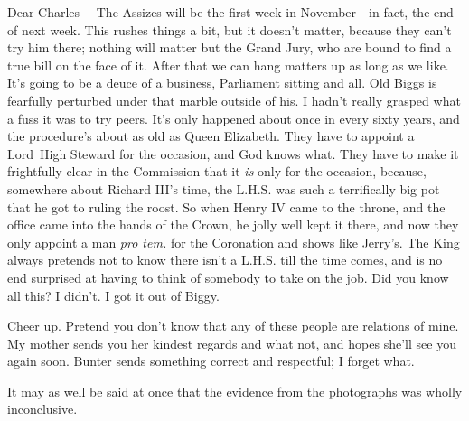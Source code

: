 \begin{mail}{}{Dear Charles---}
The Assizes will be the first week in November—in fact, the end of next week. This rushes things a bit, but it doesn't matter, because they can't try him there; nothing will matter but the Grand Jury, who are bound to find a true bill on the face of it. After that we can hang matters up as long as we like. It's going to be a deuce of a business, Parliament sitting and all. Old Biggs is fearfully perturbed under that marble outside of his. I hadn't really grasped what a fuss it was to try peers. It's only happened about once in every sixty years, and the procedure's about as old as Queen Elizabeth. They have to appoint a Lord~High Steward for the occasion, and God knows what. They have to make it frightfully clear in the Commission that it \textit{is} only for the occasion, because, somewhere about Richard III's time, the L\@.H\@.S\@. was such a terrifically big pot that he got to ruling the roost. So when Henry IV came to the throne, and the office came into the hands of the Crown, he jolly well kept it there, and now they only appoint a man \textit{pro tem.} for the Coronation and shows like Jerry's. The King always pretends not to know there isn't a L\@.H\@.S\@. till the time comes, and is no end surprised at having to think of somebody to take on the job. Did you know all this? I didn't. I got it out of Biggy.


Cheer up. Pretend you don't know that any of these people are relations of mine. My mother sends you her kindest regards and what not, and hopes she'll see you again soon. Bunter sends something correct and respectful; I forget what.

\end{mail}


It may as well be said at once that the evidence from the photographs was wholly inconclusive.
